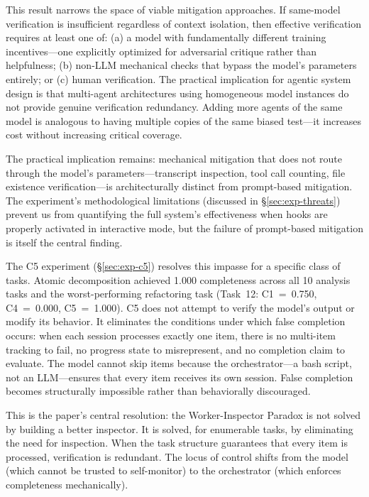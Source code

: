 This result narrows the space of viable mitigation approaches. If same-model verification is insufficient regardless of context isolation, then effective verification requires at least one of: (a) a model with fundamentally different training incentives---one explicitly optimized for adversarial critique rather than helpfulness; (b) non-LLM mechanical checks that bypass the model's parameters entirely; or (c) human verification. The practical implication for agentic system design is that multi-agent architectures using homogeneous model instances do not provide genuine verification redundancy. Adding more agents of the same model is analogous to having multiple copies of the same biased test---it increases cost without increasing critical coverage.

The practical implication remains: mechanical mitigation that does not route through the model's parameters---transcript inspection, tool call counting, file existence verification---is architecturally distinct from prompt-based mitigation.
The experiment's methodological limitations (discussed in \S\ref{sec:exp-threats}) prevent us from quantifying the full system's effectiveness when hooks are properly activated in interactive mode, but the failure of prompt-based mitigation is itself the central finding.

The C5 experiment (\S\ref{sec:exp-c5}) resolves this impasse for a specific class of tasks.
Atomic decomposition achieved 1.000 completeness across all 10 analysis tasks and the worst-performing refactoring task (Task~12: C1~=~0.750, C4~=~0.000, C5~=~1.000).
C5 does not attempt to verify the model's output or modify its behavior.
It eliminates the conditions under which false completion occurs: when each session processes exactly one item, there is no multi-item tracking to fail, no progress state to misrepresent, and no completion claim to evaluate.
The model cannot skip items because the orchestrator---a bash script, not an LLM---ensures that every item receives its own session.
False completion becomes structurally impossible rather than behaviorally discouraged.

This is the paper's central resolution: the Worker-Inspector Paradox is not solved by building a better inspector.
It is solved, for enumerable tasks, by eliminating the need for inspection.
When the task structure guarantees that every item is processed, verification is redundant.
The locus of control shifts from the model (which cannot be trusted to self-monitor) to the orchestrator (which enforces completeness mechanically).

